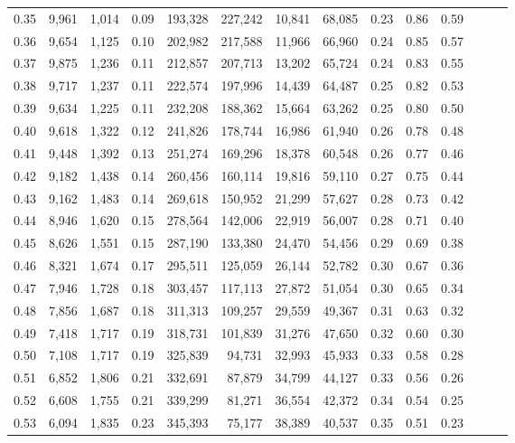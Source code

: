 \begin{tabular}{rrrrrrrrrrrrrr}
0.35 &  9,961 &  1,014 &  0.09 &  193,328 &  227,242 &  10,841 &  68,085 &  0.23 &  0.86 &      0.59 \\
0.36 &  9,654 &  1,125 &  0.10 &  202,982 &  217,588 &  11,966 &  66,960 &  0.24 &  0.85 &      0.57 \\
0.37 &  9,875 &  1,236 &  0.11 &  212,857 &  207,713 &  13,202 &  65,724 &  0.24 &  0.83 &      0.55 \\
0.38 &  9,717 &  1,237 &  0.11 &  222,574 &  197,996 &  14,439 &  64,487 &  0.25 &  0.82 &      0.53 \\
0.39 &  9,634 &  1,225 &  0.11 &  232,208 &  188,362 &  15,664 &  63,262 &  0.25 &  0.80 &      0.50 \\
0.40 &  9,618 &  1,322 &  0.12 &  241,826 &  178,744 &  16,986 &  61,940 &  0.26 &  0.78 &      0.48 \\
0.41 &  9,448 &  1,392 &  0.13 &  251,274 &  169,296 &  18,378 &  60,548 &  0.26 &  0.77 &      0.46 \\
0.42 &  9,182 &  1,438 &  0.14 &  260,456 &  160,114 &  19,816 &  59,110 &  0.27 &  0.75 &      0.44 \\
0.43 &  9,162 &  1,483 &  0.14 &  269,618 &  150,952 &  21,299 &  57,627 &  0.28 &  0.73 &      0.42 \\
0.44 &  8,946 &  1,620 &  0.15 &  278,564 &  142,006 &  22,919 &  56,007 &  0.28 &  0.71 &      0.40 \\
0.45 &  8,626 &  1,551 &  0.15 &  287,190 &  133,380 &  24,470 &  54,456 &  0.29 &  0.69 &      0.38 \\
0.46 &  8,321 &  1,674 &  0.17 &  295,511 &  125,059 &  26,144 &  52,782 &  0.30 &  0.67 &      0.36 \\
0.47 &  7,946 &  1,728 &  0.18 &  303,457 &  117,113 &  27,872 &  51,054 &  0.30 &  0.65 &      0.34 \\
0.48 &  7,856 &  1,687 &  0.18 &  311,313 &  109,257 &  29,559 &  49,367 &  0.31 &  0.63 &      0.32 \\
0.49 &  7,418 &  1,717 &  0.19 &  318,731 &  101,839 &  31,276 &  47,650 &  0.32 &  0.60 &      0.30 \\
0.50 &  7,108 &  1,717 &  0.19 &  325,839 &   94,731 &  32,993 &  45,933 &  0.33 &  0.58 &      0.28 \\
0.51 &  6,852 &  1,806 &  0.21 &  332,691 &   87,879 &  34,799 &  44,127 &  0.33 &  0.56 &      0.26 \\
0.52 &  6,608 &  1,755 &  0.21 &  339,299 &   81,271 &  36,554 &  42,372 &  0.34 &  0.54 &      0.25 \\
0.53 &  6,094 &  1,835 &  0.23 &  345,393 &   75,177 &  38,389 &  40,537 &  0.35 &  0.51 &      0.23 \\

\end{tabular}
